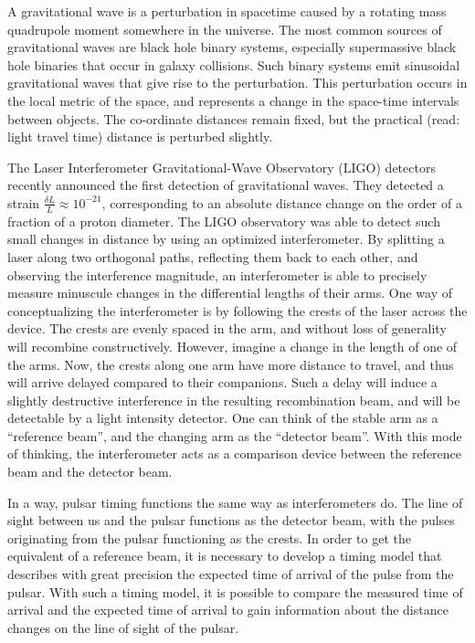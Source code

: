 \documentclass[12pt]{article}
\begin{document}
A gravitational wave is a perturbation in spacetime caused by a rotating
mass quadrupole moment somewhere in the universe. The most common sources of gravitational
waves are black hole binary systems, especially supermassive black hole binaries
that occur in galaxy collisions. Such binary systems emit sinusoidal
gravitational waves that give rise to the perturbation.
This perturbation occurs in the local metric of the space, and represents a
change in the space-time intervals between objects. The co-ordinate distances
remain fixed, but the practical (read: light travel time) distance is perturbed
slightly.

The Laser Interferometer Gravitational-Wave Observatory (LIGO) detectors recently announced the first detection of gravitational
waves. They detected a strain $\frac{\delta L}{L} \approx 10^{-21}$, corresponding to an absolute
distance change on the order of a fraction of a proton diameter. The LIGO
observatory was able to detect such small changes in distance by using an
optimized interferometer. By splitting a laser along two orthogonal paths,
reflecting them back to each other, and observing the interference magnitude, an
interferometer is able to precisely measure minuscule changes in the
differential lengths of their arms. One way of conceptualizing the
interferometer is by following the crests of the laser across the device. The
crests are evenly spaced in the arm, and without loss of generality will
recombine constructively. However, imagine a change in the length of one of the
arms. Now, the crests along one arm have more distance to travel, and thus will
arrive delayed compared to their companions. Such a delay will induce a slightly
destructive interference in the resulting recombination beam, and will be
detectable by a light intensity detector. One can think of the stable arm as a
``reference beam'', and the changing arm as the ``detector beam''. With this mode of
thinking, the interferometer acts as a comparison device between the reference
beam and the detector beam.

In a way, pulsar timing functions the same way as interferometers do. The line
of sight between us and the pulsar functions as the detector beam, with the
pulses originating from the pulsar functioning as the crests. In order to get
the equivalent of a reference beam, it is necessary to develop a timing model
that describes with great precision the expected time of arrival of the pulse
from the pulsar. With such a timing model, it is possible to compare the
measured time of arrival and the expected time of arrival to gain information
about the distance changes on the line of sight of the pulsar.
\end{document}
